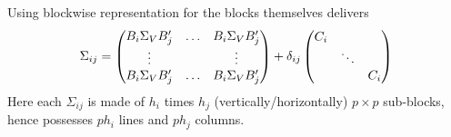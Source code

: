 \documentclass[aoas]{imsart}
\begin{document}
\begin{remark}
	Using blockwise representation for the blocks themselves delivers %
	\begin{equation*}
	\Sigma_{ij} =
	\begin{pmatrix}
	B_i\Sigma_{V} B_j' & \dots & B_i\Sigma_{V} B_j'\\
	\vdots & & \vdots\\
	B_i\Sigma_{V} B_j' & \dots & B_i\Sigma_{V} B_j'\\
	\end{pmatrix}
	+
	\delta_{ij}
	\begin{pmatrix}
	\covN_i & &\\
	& \ddots &\\
	&   & \covN_i
	\end{pmatrix}%
	\end{equation*}
	Here each $\Sigma_{ij}$ is made of $h_i$ times $h_j$
	(vertically/horizontally) $p \times p$ sub-blocks, hence possesses $ph_i$ lines and $ph_j$ columns.
\end{remark}

\end{document}
